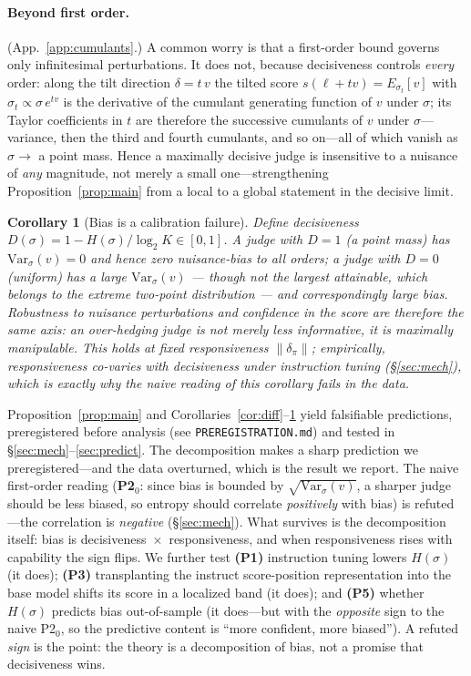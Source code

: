 \documentclass[11pt]{article}
\newtheorem{corollary}{Corollary}
\begin{document}
\paragraph{Beyond first order.} (App.~\ref{app:cumulants}.) A common worry is that a first-order bound governs only
infinitesimal perturbations. It does not, because decisiveness controls \emph{every}
order: along the tilt direction $\delta=t\,v$ the tilted score $s(\ell+tv)=E_{\sigma_t}[v]$
with $\sigma_t\propto\sigma\,e^{tv}$ is the derivative of the cumulant generating function
of $v$ under $\sigma$; its Taylor coefficients in $t$ are therefore the successive
cumulants of $v$ under $\sigma$---variance, then the third and fourth cumulants, and so
on---all of which vanish as $\sigma\!\to\!$ a point mass. Hence a
maximally decisive judge is insensitive to a nuisance of \emph{any} magnitude, not merely
a small one---strengthening Proposition~\ref{prop:main} from a local to a global
statement in the decisive limit.

\begin{corollary}[Bias is a calibration failure]\label{cor:calib}
Define decisiveness $D(\sigma)=1-H(\sigma)/\log_2 K\in[0,1]$. A judge with $D=1$ (a point
mass) has $\mathrm{Var}_\sigma(v)=0$ and hence zero nuisance-bias to all orders; a judge
with $D=0$ (uniform) has a large $\mathrm{Var}_\sigma(v)$ --- though not the largest
attainable, which belongs to the extreme two-point distribution --- and correspondingly
large bias.
Robustness to nuisance perturbations and confidence in the score are therefore the same
axis: an over-hedging judge is not merely less informative, it is maximally
manipulable. This holds \emph{at fixed responsiveness} $\|\delta_\pi\|$; empirically,
responsiveness co-varies with decisiveness under instruction tuning
(\S\ref{sec:mech}), which is exactly why the naive reading of this corollary fails in
the data.
\end{corollary}

\medskip
Proposition~\ref{prop:main} and Corollaries~\ref{cor:diff}--\ref{cor:calib} yield
falsifiable predictions, preregistered before
analysis (see \texttt{PREREGISTRATION.md}) and tested in \S\ref{sec:mech}--\ref{sec:predict}.
The decomposition makes a sharp prediction we preregistered---and the data overturned,
which is the result we report. The naive first-order reading (\textbf{P2$_0$}: since bias
is bounded by $\sqrt{\mathrm{Var}_\sigma(v)}$, a sharper judge should be less biased, so
entropy should correlate \emph{positively} with bias) is refuted---the correlation is
\emph{negative} (\S\ref{sec:mech}). What survives is the decomposition itself: bias is
decisiveness~$\times$~responsiveness, and when responsiveness rises with capability the
sign flips. We further test \textbf{(P1)} instruction tuning lowers $H(\sigma)$ (it
does); \textbf{(P3)} transplanting the instruct score-position representation into the
base model shifts its score in a localized band (it does); and \textbf{(P5)} whether
$H(\sigma)$ predicts bias out-of-sample (it does---but with the \emph{opposite} sign to
the naive P2$_0$, so the predictive content is ``more confident, more biased''). A
refuted \emph{sign} is the point: the theory is a decomposition of bias, not a promise
that decisiveness wins.
\end{document}
